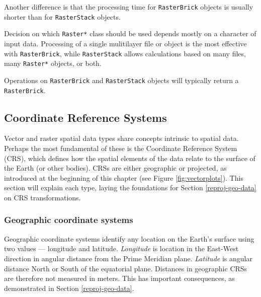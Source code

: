 \documentclass[]{krantz}
\let\BeginKnitrBlock\begin \let\EndKnitrBlock\end
\begin{document}
Another difference is that the processing time for \texttt{RasterBrick} objects is usually shorter than for \texttt{RasterStack} objects.

Decision on which \texttt{Raster*} class should be used depends mostly on a character of input data.
Processing of a single mulitilayer file or object is the most effective with \texttt{RasterBrick}, while \texttt{RasterStack} allows calculations based on many files, many \texttt{Raster*} objects, or both.

\BeginKnitrBlock{rmdnote}
Operations on \texttt{RasterBrick} and \texttt{RasterStack} objects will typically return a \texttt{RasterBrick}.
\EndKnitrBlock{rmdnote}

\hypertarget{crs-intro}{%
\subsection{Coordinate Reference Systems}\label{crs-intro}}

Vector and raster spatial data types share concepts intrinsic to spatial data.
Perhaps the most fundamental of these is the Coordinate Reference System (CRS), which defines how the spatial elements of the data relate to the surface of the Earth (or other bodies).
CRSs are either geographic or projected, as introduced at the beginning of this chapter (see Figure \ref{fig:vectorplots}).
This section will explain each type, laying the foundations for Section \ref{reproj-geo-data} on CRS transformations.

\hypertarget{geographic-coordinate-systems}{%
\subsubsection{Geographic coordinate systems}\label{geographic-coordinate-systems}}

Geographic coordinate systems identify any location on the Earth's surface using two values --- longitude and latitude.
\emph{Longitude} is location in the East-West direction in angular distance from the Prime Meridian plane.
\emph{Latitude} is angular distance North or South of the equatorial plane.
Distances in geographic CRSs are therefore not measured in meters.
This has important consequences, as demonstrated in Section \ref{reproj-geo-data}.
\end{document}
